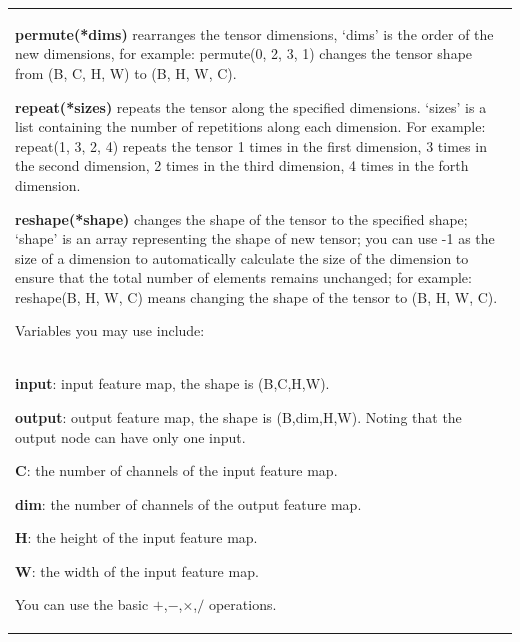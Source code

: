 \begin{table}[htbp]
{\begin{tabular}{p{}}
\begin{list}{}{\setlength{\leftmargin}{8mm}}
            \setlength{\itemsep}{0pt}
            \setlength{\parskip}{0pt}
            \item \textbf{permute(*dims)} rearranges the tensor dimensions, `dims' is the order of the new dimensions, for example: permute(0, 2, 3, 1) changes the tensor shape from (B, C, H, W) to (B, H, W, C).
            \item \textbf{repeat(*sizes)} repeats the tensor along the specified dimensions. `sizes' is a list containing the number of repetitions along each dimension. For example: repeat(1, 3, 2, 4) repeats the tensor 1 times in the first dimension, 3 times in the second dimension, 2 times in the third dimension, 4 times in the forth dimension.
            \item \textbf{reshape(*shape)} changes the shape of the tensor to the specified shape; `shape' is an array representing the shape of new tensor; you can use -1 as the size of a dimension to automatically calculate the size of the dimension to ensure that the total number of elements remains unchanged; for example: reshape(B, H, W, C) means changing the shape of the tensor to (B, H, W, C).
        \end{list}
        \vspace{-3mm}
        Variables you may use include:\\
        \vspace{-5mm}
        \begin{list}{}{\setlength{\leftmargin}{8mm}}
            \setlength{\itemsep}{0pt}
            \setlength{\parskip}{0pt}
            \item \textbf{input}: input feature map, the shape is (B,C,H,W).
            \item \textbf{output}: output feature map, the shape is (B,dim,H,W). Noting that the output node can have only one input.
            \item \textbf{C}: the number of channels of the input feature map.
            \item \textbf{dim}: the number of channels of the output feature map.
            \item \textbf{H}: the height of the input feature map.
            \item \textbf{W}: the width of the input feature map.
        \end{list}
        \vspace{-3mm}
        You can use the basic \textbf{$+$},\textbf{$-$},\textbf{$\times$},\textbf{$/$} operations.\\
        \hline
    \end{tabular}
    }
    \label{tab:prompt_dag}
\end{table}
